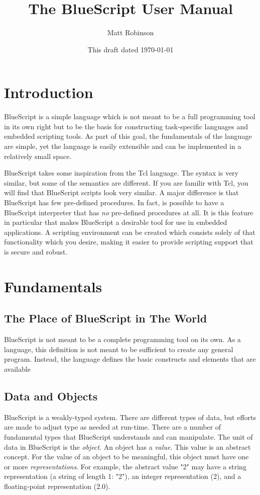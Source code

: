 \documentclass[10pt]{book}
\title{The BlueScript User Manual}
\author{Matt Robinson}
\date{This draft dated \today}
\newcommand{\bsdefn}[1]{\textit{#1}}
\begin{document}
\maketitle

\chapter {Introduction}

BlueScript is a simple language which is not meant to be a full programming tool in its own right but to be the basis for constructing task-specific languages and embedded scripting tools.  As part of this goal, the fundamentals of the language are simple, yet the language is easily extensible and can be implemented in a relatively small space.

BlueScript takes some inspiration from the Tcl language.  The syntax is very similar, but some of the semantics are different.  If you are familir with Tcl, you will find that BlueScript scripts look very similar.  A major difference is that BlueScript has few pre-defined procedures.  In fact, is possible to have a BlueScript interpreter that has {\em no} pre-defined procedures at all.  It is this feature in particular that makes BlueScript a desirable tool for use in embedded applications.  A scripting environment can be created which consists solely of that functionality which you desire, making it easier to provide scripting support that is secure and robust.

\chapter{Fundamentals}

\section{The Place of BlueScript in The World}

BlueScript is not meant to be a complete programming tool on its own.  As a language, this definition is not meant to be sufficient to create any general program.  Instead, the language defines the basic constructs and elements that are available

\section{Data and Objects}

BlueScript is a weakly-typed system.  There are different types of data, but efforts are made to adjust type as needed at run-time.  There are a number of fundamental types that BlueScript understands and can manipulate.  The unit of data in BlueScript is the \bsdefn{object}.  An object has a \bsdefn{value}.  This value is an abstract concept.  For the value of an object to be meaningful, this object must have one or more \bsdefn{representations}.  For example, the abstract value "2" may have a string representation (a string of length 1:  "2"), an integer representation (2), and a floating-point representation (2.0).
\end{document}
